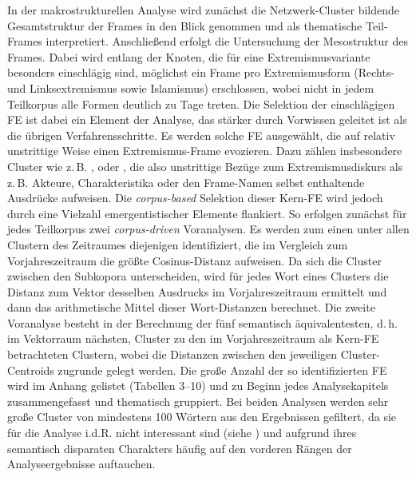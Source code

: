 In der makrostrukturellen Analyse wird zunächst die Netzwerk-Cluster bildende Gesamtstruktur der Frames in den Blick genommen und als thematische Teil-Frames interpretiert. Anschließend erfolgt die Untersuchung der Mesostruktur des Frames. Dabei wird entlang der Knoten, die für eine Extremismusvariante besonders einschlägig sind, möglichst ein Frame pro Extremismusform (Rechts- und Linksextremismus sowie Islamismus) erschlossen, wobei nicht in jedem Teilkorpus alle Formen deutlich zu Tage treten. Die Selektion der einschlägigen FE ist dabei ein Element der Analyse, das stärker durch Vorwissen geleitet ist als die übrigen Verfahrensschritte. Es werden solche FE ausgewählt, die auf relativ unstrittige Weise einen Extremismus-Frame evozieren. Dazu zählen insbesondere Cluster wie z.\,B. ,  oder , die also unstrittige Bezüge zum Extremismusdiskurs als z.\,B. Akteure, Charakteristika oder den Frame-Namen selbst enthaltende Ausdrücke aufweisen. Die \emph{corpus-based} Selektion dieser Kern-FE wird jedoch durch eine Vielzahl emergentistischer Elemente flankiert. So erfolgen zunächst für jedes Teilkorpus zwei \emph{corpus-driven} Voranalysen. Es werden zum einen unter allen Clustern des Zeitraumes diejenigen identifiziert, die im Vergleich zum Vorjahreszeitraum die größte Cosinus-Distanz aufweisen. Da sich die Cluster zwischen den Subkopora unterscheiden, wird für jedes Wort eines Clusters die Distanz zum Vektor desselben Ausdrucks im Vorjahreszeitraum ermittelt und dann das arithmetische Mittel dieser Wort-Distanzen berechnet. Die zweite Voranalyse besteht in der Berechnung der fünf semantisch äquivalentesten, d.\,h. im Vektorraum nächsten, Cluster zu den im Vorjahreszeitraum als Kern-FE betrachteten Clustern, wobei die Distanzen zwischen den jeweiligen Cluster-Centroids zugrunde gelegt werden. Die große Anzahl der so identifizierten FE wird im Anhang gelistet (Tabellen 3--10) und zu Beginn jedes Analysekapitels zusammengefasst und thematisch gruppiert. Bei beiden Analysen werden sehr große Cluster von mindestens 100 Wörtern aus den Ergebnissen gefiltert, da sie für die Analyse i.d.R. nicht interessant sind (siehe ) und aufgrund ihres semantisch disparaten Charakters häufig auf den vorderen Rängen der Analyseergebnisse auftauchen.

